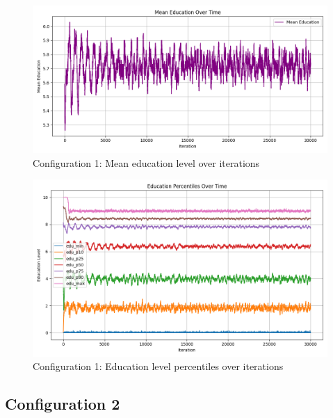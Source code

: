 \documentclass[english]{projectreport}
\begin{document}
    \begin{figure}[H]
        \centering
        \includegraphics[width=0.8\linewidth]{metrics_config1/metrics_config1_mean_education.png}
        \caption{Configuration 1: Mean education level over iterations}
        \label{fig:c0-mean_education}
    \end{figure}

    \begin{figure}[H]
        \centering
        \includegraphics[width=0.8\linewidth]{metrics_config1/metrics_config1_education_perc_time.png}
        \caption{Configuration 1: Education level percentiles over iterations}
        \label{fig:c0-education_perc_time}
    \end{figure}

\subsection*{Configuration 2}
\end{document}
